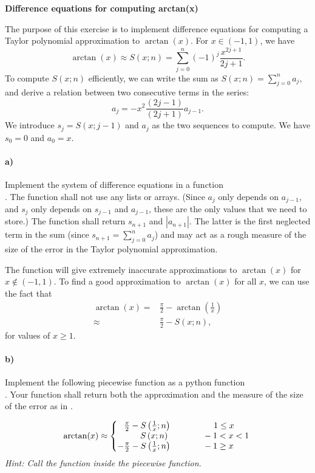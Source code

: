 \begin{Problem}
{\textbf{Difference equations for computing arctan(x)}}

\noindent
The purpose of this exercise is to implement difference equations for computing a Taylor polynomial approximation to $\arctan(x)$. For $x \in (-1, 1)$, we have
$$
\arctan(x) \approx S(x;n) = \sum_{j=0}^{n}(-1)^j\frac{x^{2j+1}}{2j+1}.
$$
To compute $S(x;n)$ efficiently, we can write the sum as $S(x;n)=\sum_{j=0}^{n}a_j$, and derive a relation between two consecutive terms in the series:
$$
a_j = -x^2\frac{(2j-1)}{(2j+1)}a_{j-1}.
$$
We introduce $s_j=S(x;j-1)$ and $a_j$ as the two sequences to compute. We have $s_0=0$ and $a_0=x$.
\paragraph{a)}
Implement the system of difference equations in a function\\ . The function shall not use any lists or arrays. (Since $a_j$ only depends on $a_{j-1}$, and $s_j$ only depends on $s_{j-1}$ and $a_{j-1}$, these are the only values that we need to store.) The function shall return $s_{n+1}$ and $|a_{n+1}|$. The latter is the first neglected term in the sum (since $s_{n+1}=\sum_{j=0}^{n}a_j$) and may act as a rough measure of the size of the error in the Taylor polynomial approximation.
\bigskip

The function  will give extremely inaccurate approximations to $\arctan(x)$ for $x\not\in (-1, 1)$. To find a good approximation to $\arctan(x)$ for all $x$, we can use the fact that
\begin{align*}
\arctan(x) =& \frac{\pi}{2} - \arctan \left(\frac{1}{x}\right)\\
\approx& \frac{\pi}{2} - S(x;n),
\end{align*}
for values of $x\geq1$.
\paragraph{b)}
Implement the following piecewise function as a python function\\ . Your function shall return both the approximation and the measure of the size of the error as in .


\[
  \arctan(x)\approx \left\{
     \begin{array}{@{}l@{\thinspace}l}
      \hspace*{2.7mm} \frac{\pi}{2} - S\left(\frac{1}{x};n\right)  \hspace*{17.5mm}  1 \leq x \\
        \hspace*{9.5mm}S\left(x;n\right) \hspace*{14.5mm} -1 < x < 1\\
       -\frac{\pi}{2} - S\left(\frac{1}{x};n\right)  \hspace*{13.5mm} -1 \geq x \\
     \end{array}
   \right.
\]
\emph{Hint: Call the function  inside the piecewise function.}

\end{Problem}
